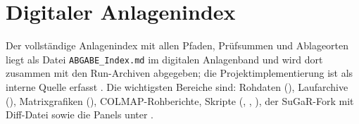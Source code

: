 \section{Digitaler Anlagenindex}

Der vollständige Anlagenindex mit allen Pfaden, Prüfsummen und Ablageorten
liegt als Datei \texttt{ABGABE\_Index.md} im digitalen Anlagenband und wird
dort zusammen mit den Run-Archiven abgegeben; die Projektimplementierung ist
als interne Quelle erfasst \parencite{scan2bimImplementation}. Die wichtigsten
Bereiche sind: Rohdaten (), Laufarchive
(), Matrixgrafiken (),
COLMAP-Rohberichte, Skripte (, ,
), der SuGaR-Fork mit Diff-Datei sowie die Panels unter
.
